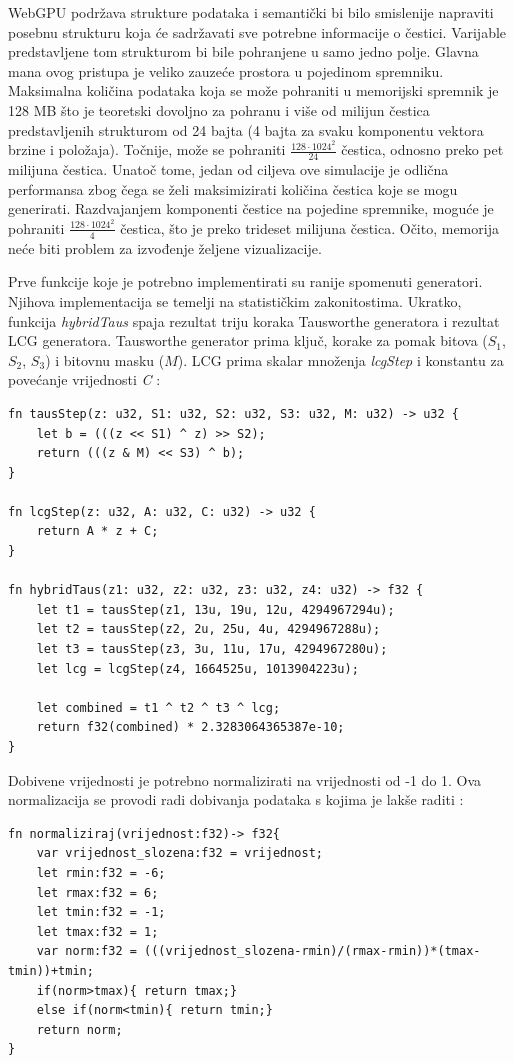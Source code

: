 \documentclass{foi}
\begin{document}
WebGPU podržava strukture podataka i semantički bi bilo smislenije napraviti posebnu strukturu koja će sadržavati sve potrebne informacije o čestici. Varijable predstavljene tom strukturom bi bile pohranjene u samo jedno polje. Glavna mana ovog pristupa je veliko zauzeće prostora u pojedinom spremniku. Maksimalna količina podataka koja se može pohraniti u memorijski spremnik je 128 MB što je teoretski dovoljno za pohranu i više od milijun čestica predstavljenih strukturom od 24 bajta (4 bajta za svaku komponentu vektora brzine i položaja). Točnije, može se pohraniti $\frac{128\cdot 1024^2}{24}$ čestica, odnosno preko pet milijuna čestica. Unatoč tome, jedan od ciljeva ove simulacije je odlična performansa zbog čega se želi maksimizirati količina čestica koje se mogu generirati. Razdvajanjem komponenti čestice na pojedine spremnike, moguće je pohraniti $\frac{128\cdot 1024^2}{4}$ čestica, što je preko trideset milijuna čestica. Očito, memorija neće biti problem za izvođenje željene vizualizacije.

Prve funkcije koje je potrebno implementirati su ranije spomenuti generatori. Njihova implementacija se temelji na statističkim zakonitostima. Ukratko, funkcija \textit{hybridTaus} spaja rezultat triju koraka Tausworthe generatora i rezultat LCG generatora. Tausworthe generator prima ključ, korake za pomak bitova ($S_1$, $S_2$, $S_3$) i bitovnu masku ($M$). LCG prima skalar množenja \textit{lcgStep} i konstantu za povećanje vrijednosti \textit{C} \parencite{NvidiaPRNG}:

\begin{verbatim}
fn tausStep(z: u32, S1: u32, S2: u32, S3: u32, M: u32) -> u32 {
	let b = (((z << S1) ^ z) >> S2);
	return (((z & M) << S3) ^ b);
}

fn lcgStep(z: u32, A: u32, C: u32) -> u32 {
	return A * z + C;
}

fn hybridTaus(z1: u32, z2: u32, z3: u32, z4: u32) -> f32 {
	let t1 = tausStep(z1, 13u, 19u, 12u, 4294967294u);
	let t2 = tausStep(z2, 2u, 25u, 4u, 4294967288u);
	let t3 = tausStep(z3, 3u, 11u, 17u, 4294967280u);
	let lcg = lcgStep(z4, 1664525u, 1013904223u);
	
	let combined = t1 ^ t2 ^ t3 ^ lcg;
	return f32(combined) * 2.3283064365387e-10;
}
\end{verbatim}

Dobivene vrijednosti je potrebno normalizirati na vrijednosti od -1 do 1. Ova normalizacija se provodi radi dobivanja podataka s kojima je lakše raditi \parencite{NormalizacijaPodataka}:
\begin{verbatim}
fn normaliziraj(vrijednost:f32)-> f32{
	var vrijednost_slozena:f32 = vrijednost;
	let rmin:f32 = -6;
	let rmax:f32 = 6;
	let tmin:f32 = -1;
	let tmax:f32 = 1;
	var norm:f32 = (((vrijednost_slozena-rmin)/(rmax-rmin))*(tmax-tmin))+tmin;
	if(norm>tmax){ return tmax;}
	else if(norm<tmin){ return tmin;}
	return norm;
}
\end{verbatim}
\end{document}

